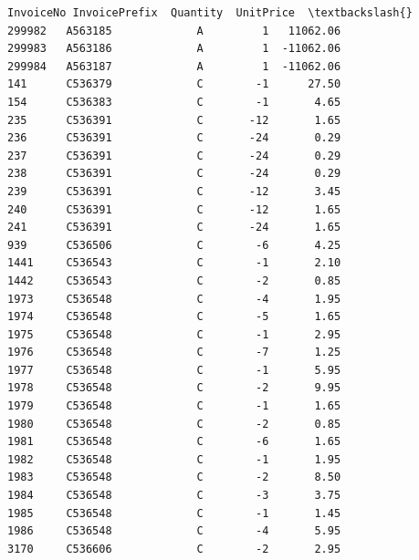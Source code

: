 \documentclass[11pt]{article}
\begin{document}
    
    \begin{Verbatim}[commandchars=\\\{\}]
       InvoiceNo InvoicePrefix  Quantity  UnitPrice  \textbackslash{}
299982   A563185             A         1   11062.06   
299983   A563186             A         1  -11062.06   
299984   A563187             A         1  -11062.06   
141      C536379             C        -1      27.50   
154      C536383             C        -1       4.65   
235      C536391             C       -12       1.65   
236      C536391             C       -24       0.29   
237      C536391             C       -24       0.29   
238      C536391             C       -24       0.29   
239      C536391             C       -12       3.45   
240      C536391             C       -12       1.65   
241      C536391             C       -24       1.65   
939      C536506             C        -6       4.25   
1441     C536543             C        -1       2.10   
1442     C536543             C        -2       0.85   
1973     C536548             C        -4       1.95   
1974     C536548             C        -5       1.65   
1975     C536548             C        -1       2.95   
1976     C536548             C        -7       1.25   
1977     C536548             C        -1       5.95   
1978     C536548             C        -2       9.95   
1979     C536548             C        -1       1.65   
1980     C536548             C        -2       0.85   
1981     C536548             C        -6       1.65   
1982     C536548             C        -1       1.95   
1983     C536548             C        -2       8.50   
1984     C536548             C        -3       3.75   
1985     C536548             C        -1       1.45   
1986     C536548             C        -4       5.95   
3170     C536606             C        -2       2.95   


\end{Verbatim}
\end{document}
